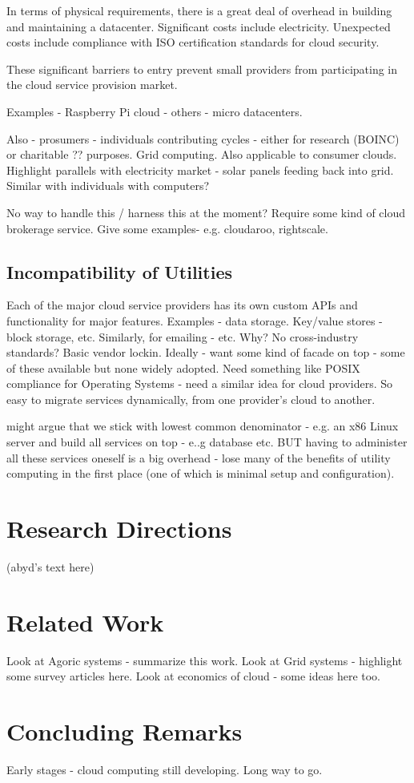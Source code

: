 \documentclass[conference,10pt]{IEEEtran}
\begin{document}
In terms of physical requirements, there is a great deal of overhead in building and maintaining a datacenter. Significant costs include electricity. Unexpected costs include compliance with ISO certification standards for cloud security.

These significant barriers to entry prevent small providers from participating in the cloud service provision market. 

Examples - Raspberry Pi cloud - others - micro datacenters.


Also - prosumers - individuals contributing cycles - either for research (BOINC) or charitable ?? purposes. Grid computing. Also applicable to consumer clouds. Highlight parallels with electricity market - solar panels feeding back into grid. Similar with individuals with computers?

No way to handle this / harness this at the moment?
Require some kind of cloud brokerage service.
Give some examples- e.g. cloudaroo, rightscale.


\subsection{Incompatibility of Utilities}

Each of the major cloud service providers has its own custom APIs and functionality for major features. Examples - data storage. Key/value stores - block storage, etc. Similarly, for emailing - etc. 
Why? No cross-industry standards? 
Basic vendor lockin. Ideally - want some kind of facade on top - some of these available but none widely adopted. Need something like POSIX compliance for Operating Systems - need a similar idea for cloud providers.
So easy to migrate services dynamically, from one provider's cloud to another.

might argue that we stick with lowest common denominator - e.g. an x86 Linux server and build all services on top - e..g database etc. BUT having to administer all these services oneself is a big overhead - lose many of the benefits of utility computing in the first place (one of which is minimal setup and configuration).


\section{Research Directions}

(abyd's text here)

\section{Related Work}

Look at Agoric systems - summarize this work.
Look at Grid systems - highlight some survey articles here.
Look at economics of cloud - some ideas here too.

\section{Concluding Remarks}

Early stages - cloud computing still developing. Long way to go.
\end{document}
